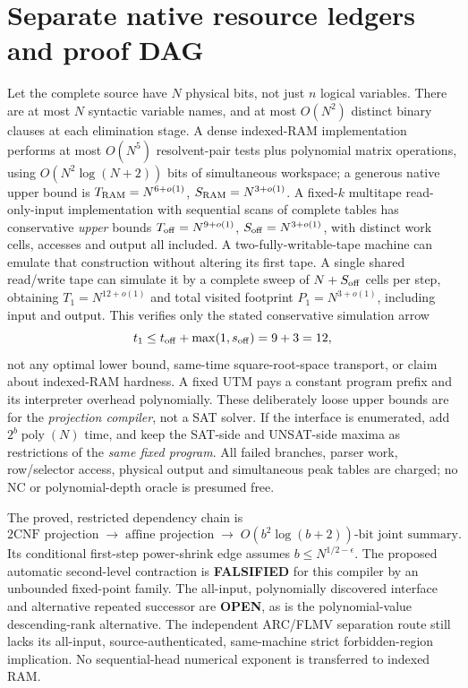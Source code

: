 \documentclass[11pt]{article}
\begin{document}
\section{Separate native resource ledgers and proof DAG}
Let the complete source have $N$ physical bits, not just $n$ logical variables. There are at most $N$ syntactic variable names, and at most $O(N^2)$ distinct binary clauses at each elimination stage. A dense indexed-RAM implementation performs at most $O(N^5)$ resolvent-pair tests plus polynomial matrix operations, using $O(N^2\log(N+2))$ bits of simultaneous workspace; a generous native upper bound is $T_{\rm RAM}=N^{6+o(1)}$, $S_{\rm RAM}=N^{3+o(1)}$. A fixed-$k$ multitape read-only-input implementation with sequential scans of complete tables has conservative \emph{upper} bounds $T_{\rm off}=N^{9+o(1)}$, $S_{\rm off}=N^{3+o(1)}$, with distinct work cells, accesses and output all included. A two-fully-writable-tape machine can emulate that construction without altering its first tape. A single shared read/write tape can simulate it by a complete sweep of $N+S_{\rm off}$ cells per step, obtaining $T_1=N^{12+o(1)}$ and total visited footprint $P_1=N^{3+o(1)}$, including input and output. This verifies only the stated conservative simulation arrow
\[
 t_1\le t_{\rm off}+\max(1,s_{\rm off})=9+3=12,
\]
not any optimal lower bound, same-time square-root-space transport, or claim about indexed-RAM hardness. A fixed UTM pays a constant program prefix and its interpreter overhead polynomially. These deliberately loose upper bounds are for the \emph{projection compiler}, not a SAT solver. If the interface is enumerated, add $2^b\operatorname{poly}(N)$ time, and keep the SAT-side and UNSAT-side maxima as restrictions of the \emph{same fixed program}. All failed branches, parser work, row/selector access, physical output and simultaneous peak tables are charged; no NC or polynomial-depth oracle is presumed free.

The proved, restricted dependency chain is
\[
\text{2CNF projection}\;\longrightarrow\;\text{affine projection}
\;\longrightarrow\; O(b^2\log(b+2))\text{-bit joint summary}.
\]
Its conditional first-step power-shrink edge assumes $b\le N^{1/2-\epsilon}$.
The proposed automatic second-level contraction is \textbf{FALSIFIED} for
this compiler by an unbounded fixed-point family. The all-input,
polynomially discovered interface and alternative repeated successor are
\textbf{OPEN}, as is the polynomial-value descending-rank alternative.
The independent ARC/FLMV separation route still lacks its all-input,
source-authenticated, same-machine strict forbidden-region implication.
No sequential-head numerical exponent is transferred to indexed RAM.
\end{document}
